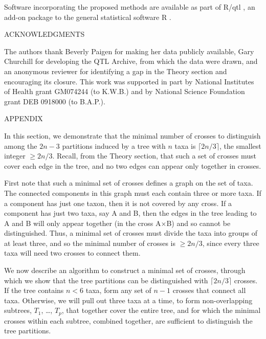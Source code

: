 \documentclass[12pt,letterpaper]{article}
\begin{document}
Software incorporating the proposed methods are available as part of
R/qtl \citep[\url{http://www.rqtl.org}]{Broman2003}, an add-on package
to the general statistical software R \citep{R}.



\clearpage
\centerline{ACKNOWLEDGMENTS} 

The authors thank Beverly Paigen for making her data publicly
available, Gary Churchill for developing the QTL Archive, from
which the data were drawn, and an anonymous reviewer for
identifying a gap in the Theory section and encouraging its closure.
This work was supported in part by
National Institutes of Health grant GM074244 (to K.W.B.)
and by National Science Foundation grant DEB 0918000 (to B.A.P.).



\clearpage

\renewcommand*{\refname}{\centerline{\normalsize\rm LITERATURE CITED}}



\clearpage
\centerline{APPENDIX}

In this section, we demonstrate that the minimal number of
crosses to distinguish among the $2n-3$ partitions induced by a tree
with $n$ taxa is $\lceil 2n/3 \rceil$, the smallest integer $\ge 2n/3$.
Recall, from the Theory section, that such a set of crosses must cover
each edge in the tree, and no two edges can appear only together in
crosses.  

First note that such a minimal set of crosses defines a graph on the set of taxa.
The connected components in this graph must each contain three or more
taxa.  If a component has just one taxon, then it is not covered by any
cross.  If a component has just two taxa, say A and B, then the edges
in the tree
leading to A and B will only appear together (in the cross A$\times$B)
and so cannot be distinguished.  Thus, a minimal set of crosses must
divide the taxa into groups of at least three, and so the minimal
number of crosses is $\ge 2n/3$, since every three taxa will need two
crosses to connect them.

We now
describe an algorithm to construct a minimal set of crosses, through which
we show that the tree partitions can be distinguished with $\lceil
2n/3 \rceil$ crosses.  If the tree contains $n< 6$ taxa, form any set of $n-1$
crosses that connect all taxa.  Otherwise, we will pull out three taxa
at a time, to form non-overlapping subtrees, $T_1$, \dots, $T_p$, that together
cover the entire tree, and for which the minimal crosses within each
subtree, combined together, are sufficient to distinguish the tree partitions.
\end{document}
